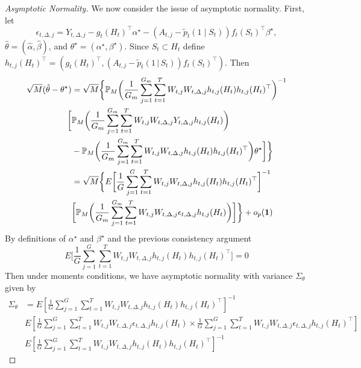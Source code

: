\documentclass[supplementary, lineno]{biometrika}
\def\given{\, | \,}
\begin{document}
\begin{proof}[Asymptotic Normality]
We now consider the issue of asymptotic normality.  First, let
\[
\epsilon_{t,\Delta,j} = Y_{t,\Delta,j} - g_t(H_t)^\top \alpha^\star - (A_{t,j}-\tilde{p}_t(1 \mid S_t)) f_t(S_t)^{\top} \beta^\star,
\]
$\hat{\theta} = (\hat{\alpha}, \hat{\beta})$, and $\theta^\star = (\alpha^\star, \beta^\star)$.
Since $S_t \subset H_t$ define $h_{t,j}(H_t)^\top = (g_t(H_t)^\top, (A_{t,j}-\tilde{p}_t(1 \given S_t)) f_t(S_t)^\top)$. Then
\begin{align*}
\sqrt{M} ( \hat{\theta} - \theta^\star )
  &= \sqrt{M} \bigg \{ \mathbb{P}_M \bigg( \frac{1}{G_m} \sum_{j=1}^{G_m} \sum_{t=1}^T W_{t,j} W_{t,\Delta, j} h_{t,j}(H_t) h_{t,j}(H_t)^\top \bigg)^{-1} \\
  \bigg[
    &\mathbb{P}_M \bigg( \frac{1}{G_m} \sum_{j=1}^{G_m} \sum_{t=1}^T W_{t,j}
    W_{t,\Delta,j} Y_{t,\Delta,j} h_{t,j}(H_t) \bigg) \\
  &- \mathbb{P}_M \bigg( \frac{1}{G_m} \sum_{j=1}^{G_m}
  \sum_{t=1}^T W_{t,j} W_{t,\Delta,j} h_{t,j}(H_t) h_{t,j}(H_t)^\top \bigg)
    \theta^\star \bigg] \bigg \} \\
  &= \sqrt{M} \bigg \{ E \bigg[
  \frac{1}{G} \sum_{j=1}^G \sum_{t=1}^T W_{t,j} W_{t,\Delta,j} h_{t,j}(H_t)
  h_{t,j}(H_t)^\top \bigg]^{-1} \\
  &\bigg[ \mathbb{P}_M \bigg( \frac{1}{G_m} \sum_{j=1}^{G_m} \sum_{t=1}^T
    W_{t,j} W_{t,\Delta,j} \epsilon_{t,\Delta, j} h_{t,j}(H_t) \bigg) \bigg] \bigg \} + o_p ( {\bf 1} )
\end{align*}
By definitions of $\alpha^\star$ and $\beta^\star$ and the previous consistency argument
\[
E \bigg[
  \frac{1}{G} \sum_{j=1}^G \sum_{t=1}^T W_{t,j} W_{t,\Delta, j} h_{t,j}(H_t)
  h_{t,j}(H_t)^\top \bigg]  = 0
\]
Then under moments conditions, we have asymptotic normality with variance $\Sigma_{\theta}$ given by
\begin{align*}
\Sigma_{\theta} &= E \left[ \frac{1}{G} \sum_{j=1}^G \sum_{t=1}^T W_{t,j} W_{t,\Delta,j} h_{t,j}(H_t) h_{t,j}(H_t)^\top \right]^{-1} \\
                &E \left[ \frac{1}{G} \sum_{j=1}^G \sum_{t=1}^T W_{t,j} W_{t,\Delta,j} \epsilon_{t,\Delta,j} h_{t,j}(H_t)
                  \times  \frac{1}{G} \sum_{j=1}^G \sum_{t=1}^T W_{t,j} W_{t,\Delta,j}  \epsilon_{t,\Delta, j} h_{t,j}(H_t)^\top \right] \\
                &E \left[ \frac{1}{G} \sum_{j=1}^G \sum_{t=1}^T W_{t,j} W_{t,\Delta,j}  h_{t,j}(H_t) h_{t,j}(H_t)^\top \right]^{-1}
\end{align*}

\end{proof}
\end{document}
